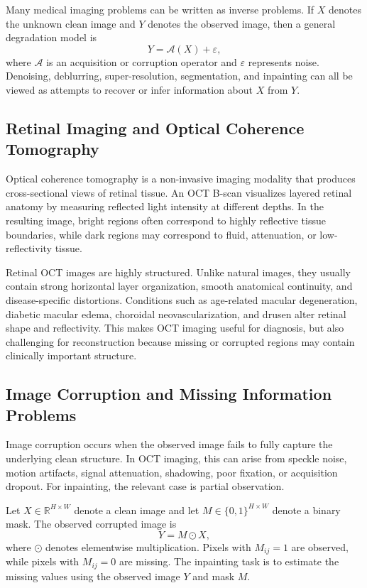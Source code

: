 \documentclass[12pt,oneside]{article}
\newcommand{\R}{\mathbb{R}}
\begin{document}
Many medical imaging problems can be written as inverse problems. If $X$ denotes the unknown clean image and $Y$ denotes the observed image, then a general degradation model is
\[
Y = \mathcal{A}(X) + \varepsilon,
\]
where $\mathcal{A}$ is an acquisition or corruption operator and $\varepsilon$ represents noise. Denoising, deblurring, super-resolution, segmentation, and inpainting can all be viewed as attempts to recover or infer information about $X$ from $Y$.

\subsection*{Retinal Imaging and Optical Coherence Tomography}

Optical coherence tomography is a non-invasive imaging modality that produces cross-sectional views of retinal tissue. An OCT B-scan visualizes layered retinal anatomy by measuring reflected light intensity at different depths. In the resulting image, bright regions often correspond to highly reflective tissue boundaries, while dark regions may correspond to fluid, attenuation, or low-reflectivity tissue.

Retinal OCT images are highly structured. Unlike natural images, they usually contain strong horizontal layer organization, smooth anatomical continuity, and disease-specific distortions. Conditions such as age-related macular degeneration, diabetic macular edema, choroidal neovascularization, and drusen alter retinal shape and reflectivity. This makes OCT imaging useful for diagnosis, but also challenging for reconstruction because missing or corrupted regions may contain clinically important structure.

\subsection*{Image Corruption and Missing Information Problems}

Image corruption occurs when the observed image fails to fully capture the underlying clean structure. In OCT imaging, this can arise from speckle noise, motion artifacts, signal attenuation, shadowing, poor fixation, or acquisition dropout. For inpainting, the relevant case is partial observation.

Let $X \in \R^{H \times W}$ denote a clean image and let $M \in \{0,1\}^{H \times W}$ denote a binary mask. The observed corrupted image is
\[
Y = M \odot X,
\]
where $\odot$ denotes elementwise multiplication. Pixels with $M_{ij}=1$ are observed, while pixels with $M_{ij}=0$ are missing. The inpainting task is to estimate the missing values using the observed image $Y$ and mask $M$.
\end{document}
